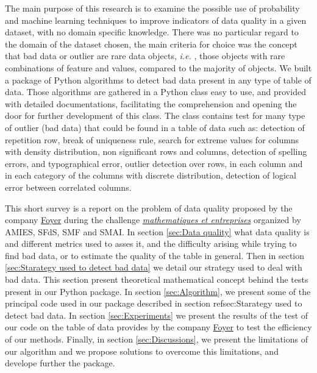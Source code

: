\documentclass{article}
\begin{document}
The main purpose of this research is to examine the possible use of probability and machine learning techniques to improve indicators
of data quality in a given dataset, with no domain specific knowledge.
There was no particular regard to the domain of the dataset chosen, the main criteria for choice was the concept that bad data or outlier are rare data objects, \textit{i.e.} , those objects with rare combinations of feature and values, compared to the majority of objects.
We built a package of Python algorithms to detect bad data present in any type of table of data. Those algorithms are gathered in a Python class easy to use, and provided with detailed documentations, facilitating the comprehension and opening the door for further development of this class. The class contains test for many type of outlier (bad data) that could be found in a table of data such as: detection of repetition row, break of uniqueness rule, search for extreme values for columns with density distribution, non significant rows and columns, detection of spelling errors, and typographical error, outlier detection over rows, in each column and in each category of the columns with discrete distribution, detection of logical error between correlated columns.

This short survey is a report on the problem of data quality proposed by the company \href{ https://www.foyer.lu/en/homepage}{Foyer} during the challenge \href{https://challenge-maths.sciencesconf.org/}{\textit{mathematiques et entreprises}} organized by AMIES,  SFdS, SMF and SMAI.
In section \ref{sec:Data quality} what data quality is and different metrics used to asses it, and the difficulty arising while trying to find bad data, or to estimate the quality of the table in general. Then in section \ref{sec:Starategy used to detect bad data} we detail our strategy used to deal with bad data. This section present theoretical mathematical concept behind the tests present in our Python package. In section \ref{sec:Algorithm}, we present some of the principal code used in our package described in section ref{sec:Starategy used to detect bad data}. In section \ref{sec:Experiments} we present the results of the test of our code on the table of data provides by the company \href{ https://www.foyer.lu/en/homepage}{Foyer} to test the efficiency of our methods. Finally, in section \ref{sec:Discussions}, we present the limitations of our algorithm and we propose solutions to overcome this limitations, and develope further the package.

\end{document}
